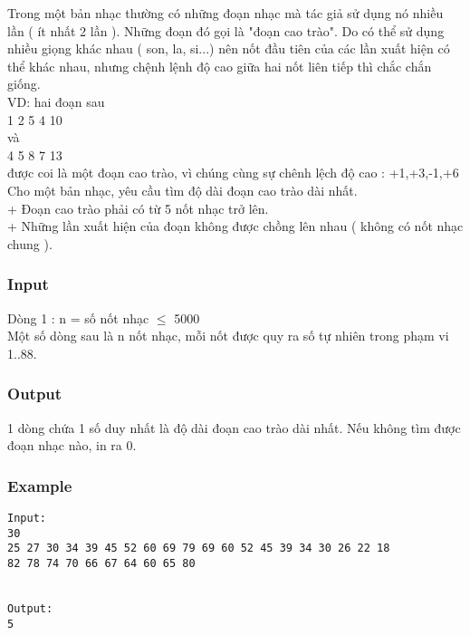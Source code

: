 



   Trong một bản nhạc thường có những đoạn nhạc mà tác giả sử dụng nó nhiều lần ( ít nhất 2 lần ). Những đoạn đó gọi là "đoạn cao trào". Do có thể sử dụng nhiều giọng khác nhau ( son, la, si...) nên nốt đầu tiên của các lần xuất hiện có thể khác nhau, nhưng chệnh lệnh độ cao giữa hai nốt liên tiếp thì chắc chắn giống.   
\\   VD: hai đoạn sau   
\\   1 2 5 4 10   
\\   và   
\\   4 5 8 7 13   
\\   được coi là một đoạn cao trào, vì chúng cùng sự chênh lệch độ cao : +1,+3,-1,+6   
\\   Cho một bản nhạc, yêu cầu tìm độ dài đoạn cao trào dài nhất.   
\\   + Đoạn cao trào phải có từ 5 nốt nhạc trở lên.   
\\   + Những lần xuất hiện của đoạn không được chồng lên nhau ( không có nốt nhạc chung ).   
\\

\subsubsection{   Input  }

   Dòng 1 : n = số nốt nhạc  $\le$  5000   
\\   Một số dòng sau là n nốt nhạc, mỗi nốt được quy ra số tự nhiên trong phạm vi 1..88.   
\\

\subsubsection{   Output  }

   1 dòng chứa 1 số duy nhất là độ dài đoạn cao trào dài nhất. Nếu không tìm được đoạn nhạc nào, in ra 0.  

\subsubsection{   Example  }
\begin{verbatim}
Input:
30
25 27 30 34 39 45 52 60 69 79 69 60 52 45 39 34 30 26 22 18
82 78 74 70 66 67 64 60 65 80


Output:
5
\end{verbatim}
